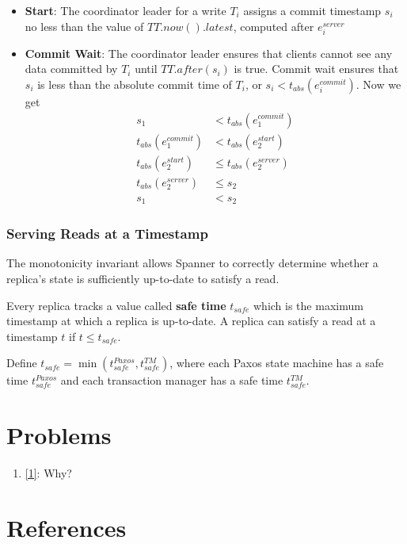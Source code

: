 \documentclass[11pt]{article}
\begin{document}
\begin{itemize}
\item \textbf{Start}: The coordinator leader for a write \(T_i\) assigns a commit timestamp \(s_i\) no less than the
value of \(TT.now().latest\), computed after \(e_i^{server}\)
\item \textbf{Commit Wait}: The coordinator leader ensures that clients cannot see any data committed by \(T_i\)
until \(TT.after(s_i)\) is true. Commit wait ensures that \(s_i\) is less than the absolute commit
time of \(T_i\), or \(s_i<t_{abs}(e_i^{commit})\). Now we get
\begin{align*}
s_1&<t_{abs}(e_1^{commit})\tag{commit wait}\\
t_{abs}(e_1^{commit})&<t_{abs}(e_2^{start})\tag{assumption}\\
t_{abs}(e_2^{start})&\le t_{abs}(e_2^{server})\tag{causality}\\
t_{abs}(e_2^{server})&\le s_2\tag{start}\\
s_1&<s_2
\end{align*}
\end{itemize}
\subsubsection{Serving Reads at a Timestamp}
\label{sec:org9c77f23}
The monotonicity invariant allows Spanner to correctly determine whether a replica's state is
sufficiently up-to-date to satisfy a read.

Every replica tracks a value called \textbf{safe time} \(t_{safe}\) which is the maximum timestamp at which a
replica is up-to-date. A replica can satisfy a read at a timestamp \(t\) if \(t\le t_{safe}\).

Define \(t_{safe}=\min(t_{safe}^{Paxos},t_{safe}^{TM})\), where each Paxos state machine has a safe
time \(t_{safe}^{Paxos}\) and each transaction manager has a safe time \(t_{safe}^{TM}\).
\section{Problems}
\label{sec:org4e7ed59}
\begin{enumerate}
\item \ref{1}: Why?
\end{enumerate}
\section{References}
\label{sec:orgf671db7}
\label{bibliographystyle link}


\label{bibliography link}

\end{document}
